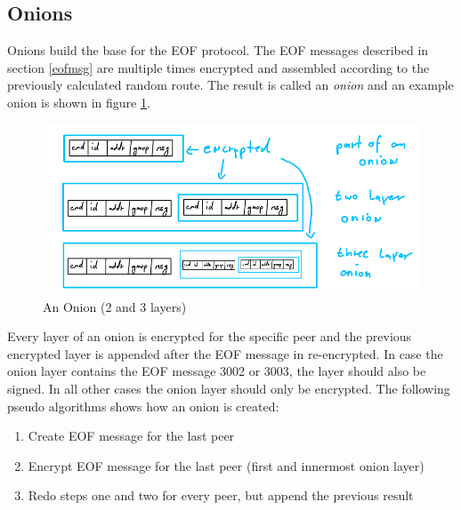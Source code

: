 \subsection{Onions}
\label{eofonion}
Onions build the base for the EOF protocol.
The EOF messages described in section \ref{eofmsg}
are multiple times encrypted and assembled according to 
the previously calculated random route. 
The result is called an \textit{onion} and
an example onion is shown in figure \ref{onion}.
\begin{figure}
    \centering
    \caption{An Onion (2 and 3 layers)}
    \label{onion}
    \includegraphics[scale=0.8]{onion.png}
\end{figure}
Every layer of an onion is encrypted for the specific peer
and the previous encrypted layer is appended after the EOF message
in re-encrypted.
In case the onion layer contains the EOF message
3002 or 3003, the layer should also be signed. In all other
cases the onion layer should only be encrypted. The following
pseudo algorithms shows how an onion is created:
\begin{enumerate}
\item Create EOF message for the last peer
\item Encrypt EOF message for the last peer (first and innermost onion layer)
\item Redo steps one and two for every peer, but append the previous result
\end{enumerate}
